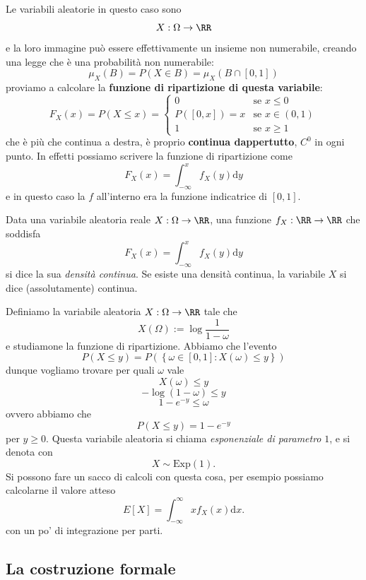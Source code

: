\documentclass[11pt]{scrartcl}
\newcommand{\dif}{\text{d}}
\begin{document}
	Le variabili aleatorie in questo caso sono
	$$X:\Omega\to \RR$$
	e la loro immagine può essere effettivamente un insieme non numerabile, creando una legge che è una probabilità non numerabile:
	$$\mu_X(B)=P(X\in B)=\mu_X(B\cap [0,1])$$
	proviamo a calcolare la \textbf{funzione di ripartizione di questa variabile}:
	$$F_X(x)=P(X\le x)=\begin{cases}
		0 & \text{se $x\le 0$} \\
		P([0,x])=x & \text{se $x\in (0,1)$} \\
		1 & \text{se $x\ge 1$}
	\end{cases}$$
	che è più che continua a destra, è proprio \textbf{continua dappertutto}, $C^0$ in ogni punto. In effetti possiamo scrivere la funzione di ripartizione come
	$$F_X(x)=\int_{-\infty}^x f_X(y)\dif y$$
	e in questo caso la $f$ all'interno era la funzione indicatrice di $[0,1]$.
	\begin{definition}
		Data una variabile aleatoria reale $X:\Omega\to \RR$, una funzione $f_X:\RR\to\RR$ che soddisfa
		$$F_X(x)=\int_{-\infty}^x f_X(y)\dif y$$
		si dice la sua \textit{densità continua}. Se esiste una densità continua, la variabile $X$ si dice (assolutamente) continua.
	\end{definition}
	\begin{example}
		Definiamo la variabile aleatoria $X:\Omega\to \RR$ tale che
		$$X(\Omega):=\log\frac{1}{1-\omega}$$
		e studiamone la funzione di ripartizione. 
		Abbiamo che l'evento
		$$P(X\le y)=P\left(\left\{\omega\in [0,1]:X(\omega)\le y\right\}\right)$$
		dunque vogliamo trovare per quali $\omega$ vale 
		$$X(\omega)\le y$$
		$$-\log(1-\omega)\le y$$
		$$1-e^{-y}\le \omega$$
		ovvero abbiamo che 
		$$P(X\le y)=1-e^{-y}$$
		per $y\ge 0$.
		Questa variabile aleatoria si chiama \textit{esponenziale di parametro} $1$, e si denota con 
		$$X\sim \text{Exp}(1).$$
		Si possono fare un sacco di calcoli con questa cosa, per esempio possiamo calcolarne il valore atteso
		$$E[X]=\int_{-\infty}^\infty xf_X(x)\dif x.$$
		con un po' di integrazione per parti.
	\end{example}
	\subsection{La costruzione formale}
	
\end{document}
